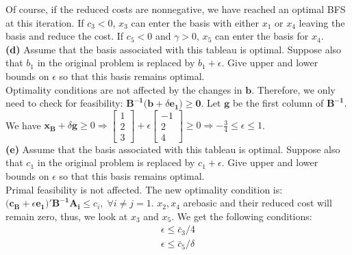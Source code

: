\documentclass{article}
\begin{document}
\noindent
Of course, if the reduced costs are nonnegative, we have reached an optimal BFS at this iteration.  If $c_3 < 0$, $x_3$ can enter the basis with either $x_1$ or $x_4$ leaving the basis and reduce the cost.  If $c_5 < 0$ and $\gamma > 0$, $x_5$ can enter the basis for $x_4$.  \\

\noindent
\textbf{(d)}  Assume that the basis associated with this tableau is optimal.  Suppose also that $b_1$ in the original problem is replaced by $b_1 + \epsilon$.  Give upper and lower bounds on $\epsilon$ so that this basis remains optimal. \\
 
\noindent 
Optimality conditions are not affected by the changes in $\mathbf{b}$.  Therefore, we only need to check for feasibility:  $\mathbf{B^{-1}(b } + \delta \mathbf{e_1) \geq 0}$.  Let $\mathbf{g}$ be the first column of $\mathbf{B^{-1}}$.  \\
We have $\mathbf{x_B} + \delta \mathbf{g} \geq 0 \Rightarrow 
\begin{bmatrix}
1 \\
2 \\
3
\end{bmatrix}
+ \epsilon
\begin{bmatrix}
-1 \\
2 \\
4
\end{bmatrix}
\geq 0
\Rightarrow - \frac{3}{4} \leq \epsilon \leq 1 $. \\

\noindent
\textbf{(e)}  Assume that the basis associated with this tableau is optimal.  Suppose also that $c_1$ in the original problem is replaced by $c_1 + \epsilon$.  Give upper and lower bounds on $\epsilon$ so that this basis remains optimal. \\

\noindent
Primal feasibility is not affected.  The new optimality condition is:  $(\mathbf{c_B} + \epsilon \mathbf{e_1)' B^{-1} A_i \leq } c_i, \; \forall i \neq j = 1$. $x_2, x_4$ arebasic and their reduced cost will remain zero, thus, we look at $x_3$ and $x_5.$ We get the following conditions: \\
\begin{equation*}
\begin{aligned}
\epsilon \leq \bar{c}_3 / {4} \\
\epsilon \leq \bar{c}_5 / \delta
\end{aligned}
\end{equation*}
\end{document}
